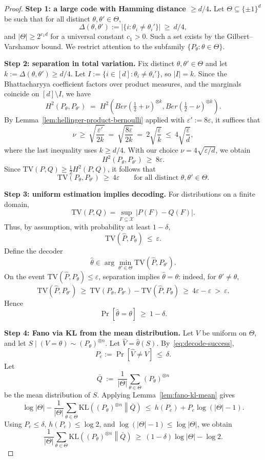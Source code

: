 \documentclass[arxiv]{colt2026}
\newcommand{\X}{\mathcal{X}}
\newcommand{\Ber}{Ber}
\newcommand{\eps}{\varepsilon}
\newcommand{\TV}{\mathrm{TV}}
\newcommand{\KL}{\mathrm{KL}}
\begin{document}
\begin{proof}
\medskip
\noindent\textbf{Step 1: a large code with Hamming distance $\ge d/4$.}
Let $\Theta\subseteq\{\pm1\}^d$ be such that for all distinct
$\theta,\theta'\in\Theta$,
\[
\Delta(\theta,\theta'):=|\{i:\theta_i\neq\theta_i'\}|\ \ge\ d/4,
\]
and $|\Theta|\ge 2^{c_1 d}$ for a universal constant $c_1>0$.
Such a set exists by the Gilbert--Varshamov bound.
We restrict attention to the subfamily $\{P_\theta:\theta\in\Theta\}$.

\medskip
\noindent\textbf{Step 2: separation in total variation.}
Fix distinct $\theta,\theta'\in\Theta$ and let $k:=\Delta(\theta,\theta')\ge d/4$.
Let $I:=\{i\in[d]:\theta_i\neq\theta_i'\}$, so $|I|=k$.
Since the Bhattacharyya coefficient factors over product measures,
and the marginals coincide on $[d]\setminus I$, we have
\[
H^2(P_\theta,P_{\theta'}) \;=\; H^2\!\left(\Ber(\tfrac12+\nu)^{\otimes k},
\Ber(\tfrac12-\nu)^{\otimes k}\right).
\]
By Lemma~\ref{lem:hellinger-product-bernoulli} applied with $\eps' := 8\eps$,
it suffices that
\[
\nu \ \ge\ \sqrt{\frac{\eps'}{2k}}
\ =\ \sqrt{\frac{8\eps}{2k}}
\ =\ 2\sqrt{\frac{\eps}{k}}
\ \le\ 4\sqrt{\frac{\eps}{d}},
\]
where the last inequality uses $k\ge d/4$.
With our choice $\nu = 4\sqrt{\eps/d}$, we obtain
\[
H^2(P_\theta,P_{\theta'}) \ \ge\ 8\eps .
\]
Since $\TV(P,Q)\ge \tfrac12 H^2(P,Q)$, it follows that
\[
\TV(P_\theta,P_{\theta'}) \ \ge\ 4\eps
\qquad
\text{for all distinct }\theta,\theta'\in\Theta.
\]

\medskip
\noindent\textbf{Step 3: uniform estimation implies decoding.}
For distributions on a finite domain,
\[
\TV(P,Q)=\sup_{F\subseteq\X}|P(F)-Q(F)|.
\]
Thus, by assumption, with probability at least $1-\delta$,
\[
\TV(\widehat P,P_\theta)\ \le\ \eps.
\]
Define the decoder
\[
\widehat\theta
\in \arg\min_{\theta'\in\Theta} \TV(\widehat P,P_{\theta'}).
\]
On the event $\TV(\widehat P,P_\theta)\le\eps$, separation implies
$\widehat\theta=\theta$: indeed, for $\theta'\neq\theta$,
\[
\TV(\widehat P,P_{\theta'})
\ \ge\ \TV(P_\theta,P_{\theta'})-\TV(\widehat P,P_\theta)
\ \ge\ 4\eps-\eps
\ >\ \eps.
\]
Hence
\begin{equation}\label{eq:decode-success}
\Pr[\widehat\theta=\theta]\ \ge\ 1-\delta.
\end{equation}

\medskip
\noindent\textbf{Step 4: Fano via KL from the mean distribution.}
Let $V$ be uniform on $\Theta$, and let
$S\mid(V=\theta)\sim(P_\theta)^{\otimes n}$.
Let $\widehat V=\widehat\theta(S)$.
By~\eqref{eq:decode-success},
\[
P_e:=\Pr[\widehat V\neq V]\ \le\ \delta.
\]
Let
\[
\bar Q \ :=\ \frac1{|\Theta|}\sum_{\theta\in\Theta}(P_\theta)^{\otimes n}
\]
be the mean distribution of $S$.
Applying Lemma~\ref{lem:fano-kl-mean} gives
\begin{equation}\label{eq:fano-mean}
\log|\Theta|-\frac1{|\Theta|}\sum_{\theta\in\Theta}
\KL\!\left((P_\theta)^{\otimes n}\middle\|\bar Q\right)
\ \le\ h(P_e)+P_e\log(|\Theta|-1).
\end{equation}
Using $P_e\le\delta$, $h(P_e)\le\log2$, and $\log(|\Theta|-1)\le\log|\Theta|$,
we obtain
\[
\frac1{|\Theta|}\sum_{\theta\in\Theta}
\KL\!\left((P_\theta)^{\otimes n}\middle\|\bar Q\right)
\ \ge\ (1-\delta)\log|\Theta|-\log2.
\]


\end{proof}
\end{document}
